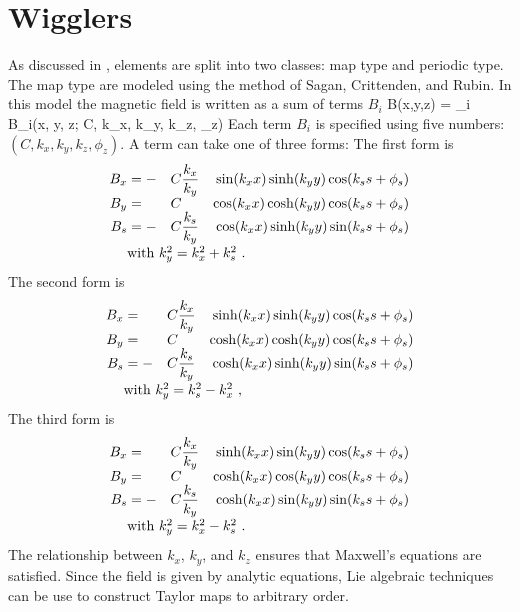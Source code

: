 \section{Wigglers}
\label{s:wiggler.phys}

As discussed in , \bmad {} elements are
split into two classes: map type and periodic type. The map type
 are modeled using the method of Sagan, Crittenden, and
Rubin\cite{b:wiggler}. In this model the magnetic field is written as
a sum of terms $B_i$
\Begineq
  B(x,y,z) = \sum_i B_i(x, y, z; C, k_x, k_y, k_z, \phi_z)
\Endeq 
Each term $B_i$ is specified using five numbers: 
$(C, k_x, k_y, k_z, \phi_z)$. A term can take one of three forms: The first
form is
\begin{alignat}{4}
  B_x &= -&C &\dfrac{k_x}{k_y} & \sin(\kxx) \sinh(\kyy) \cos(\ksss) \CRNEG
  B_y &=  &C &                 & \cos(\kxx) \cosh(\kyy) \cos(\ksss) \CRNEG
  B_s &= -&C &\dfrac{k_s}{k_y} & \cos(\kxx) \sinh(\kyy) \sin(\ksss) \CRneg
  & \makebox[1pt][l]{with $k_y^2 = k_x^2 + k_s^2$ .} &&&  \label{f1}
\end{alignat}
The second form is
\begin{alignat}{4}
  B_x &=  &C &\dfrac{k_x}{k_y} & \sinh(\kxx) \sinh(\kyy) \cos(\ksss) \CRNEG
  B_y &=  &C &                 & \cosh(\kxx) \cosh(\kyy) \cos(\ksss) \CRNEG
  B_s &= -&C &\dfrac{k_s}{k_y} & \cosh(\kxx) \sinh(\kyy) \sin(\ksss) \CRneg
  & \makebox[1pt][l]{with $k_y^2 = k_s^2 - k_x^2$ ,} &&&  \label{f2}
\end{alignat}
The third form is
\begin{alignat}{4}
  B_x &=  &C &\dfrac{k_x}{k_y} & \sinh(\kxx) \sin(\kyy) \cos(\ksss) \CRNEG
  B_y &=  &C &                 & \cosh(\kxx) \cos(\kyy) \cos(\ksss) \CRNEG
  B_s &= -&C &\dfrac{k_s}{k_y} & \cosh(\kxx) \sin(\kyy) \sin(\ksss) \CRneg
  & \makebox[1pt][l]{with $k_y^2 = k_x^2 - k_s^2$ .} &&& \label{f3}
\end{alignat}
The relationship between $k_x$, $k_y$, and $k_z$ ensures that
Maxwell's equations are satisfied. Since the field is given by
analytic equations, Lie algebraic techniques can be use to construct
Taylor maps to arbitrary order.


